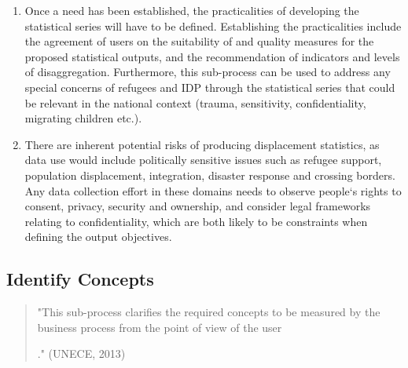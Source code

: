 \documentclass[
]{article}
\begin{document}
\begin{enumerate}
\def\labelenumi{\arabic{enumi}.}
\setcounter{enumi}{47}
\item
  Once a need has been established, the practicalities of developing
  the statistical series will have to be defined. Establishing the
  practicalities include the agreement of users on the suitability of
  and quality measures for the proposed statistical outputs, and the
  recommendation of indicators and levels of disaggregation.
  Furthermore, this sub-process can be used to address any special
  concerns of refugees and IDP through the statistical series that
  could be relevant in the national context (trauma, sensitivity,
  confidentiality, migrating children etc.).
\item
  There are inherent potential risks of producing displacement
  statistics, as data use would include politically sensitive issues
  such as refugee support, population displacement, integration,
  disaster response and crossing borders. Any data collection effort
  in these domains needs to observe people`s rights to consent,
  privacy, security and ownership, and consider legal frameworks
  relating to confidentiality, which are both likely to be constraints
  when defining the output objectives.
\end{enumerate}

\hypertarget{identify-concepts-1}{%
\subsection{Identify Concepts}\label{identify-concepts-1}}

\begin{quote}
"This sub-process clarifies the required concepts to be measured by
the business process from the point of view of the user

." (UNECE, 2013)
\end{quote}
\end{document}
